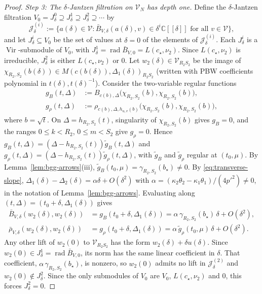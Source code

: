 \documentclass[twoside,10pt]{article}
\numberwithin{equation}{section}
\theoremstyle{slbody}
\theoremstyle{definition}
\theoremstyle{remark}
\newcommand{\Vir}{\operatorname{Vir}}
\newcommand{\rad}{\operatorname{rad}}
\begin{document}
\begin{proof}
\emph{Step 3: The \(\delta\)-Jantzen filtration on \(\mathcal{V}_N\) has depth one.}
Define the \(\delta\)-Jantzen filtration
\(V_0=J_\delta^0\supseteq J_\delta^1\supseteq J_\delta^2\supseteq\cdots\) by
\[
 \mathcal{J}_\delta^{(i)}
 :=\bigl\{a(\delta)\in\mathcal{V}:\bar B_{V,\delta}(a(\delta),v)\in\delta^i\mathbb{C}[[\delta]]
 \text{ for all }v\in\mathcal{V}\bigr\},
\]
and let \(J_\delta^i\subseteq V_0\) be the set of values at \(\delta=0\) of the
elements of \(\mathcal{J}_\delta^{(i)}\).  Each \(J_\delta^i\) is a \(\Vir\)-submodule of \(V_0\), with
\(J_\delta^1=\rad\bar B_{V,0}=L(c_\star,\nu_2)\).  Since \(L(c_\star,\nu_2)\) is
irreducible, \(J_\delta^2\) is either \(L(c_\star,\nu_2)\) or \(0\).
Let \(w_2(\delta)\in\mathcal{V}_{R_2S_2}\) be the image of
\(\chi_{R_2,S_2}(b(\delta))\in M(c(b(\delta)),\Delta_1(\delta))_{R_2S_2}\)
(written with PBW coefficients polynomial in \(t(\delta),t(\delta)^{-1}\)).
Consider the two-variable regular functions
\[
 \begin{aligned}
 g_B(t,\Delta)&:=B_{c(b),\Delta}\bigl(\chi_{R_2,S_2}(b),\chi_{R_2,S_2}(b)\bigr),\\
 g_\rho(t,\Delta)&:=\rho_{c(b),\Delta,h_{u,v}(b)}\bigl(\chi_{R_2,S_2}(b),\chi_{R_2,S_2}(b)\bigr),
 \end{aligned}
\]
where \(b=\sqrt{t}\).  On \(\Delta=h_{R_2,S_2}(t)\), singularity of
\(\chi_{R_2,S_2}(b)\) gives \(g_B=0\), and the ranges \(0\leq k<R_2\),
\(0\leq m<S_2\) give \(g_\rho=0\).  Hence
\(g_B(t,\Delta)=(\Delta-h_{R_2,S_2}(t))\tilde g_B(t,\Delta)\) and
\(g_\rho(t,\Delta)=(\Delta-h_{R_2,S_2}(t))\tilde g_\rho(t,\Delta)\), with
\(\tilde g_B\) and \(\tilde g_\rho\) regular at \((t_0,\mu)\).  By
Lemma~\ref{lem:bgg-arrows}(iii),
\(\tilde g_B(t_0,\mu)=\gamma_{R_2,S_2}(b_\star)\neq0\).  By
\eqref{eq:transverse-slope},
\(\Delta_1(\delta)-\Delta_2(\delta)=\alpha\delta+O(\delta^2)\) with
\(\alpha=(\kappa_2\theta_2-\kappa_1\theta_1)/(4p'^2)\neq0\), in the notation of
Lemma~\ref{lem:bgg-arrows}.  Evaluating along
\((t,\Delta)=(t_0+\delta,\Delta_1(\delta))\) gives
\begin{equation}\label{eq:tau-deriv-chain}
 \begin{aligned}
  \bar B_{V,\delta}(w_2(\delta),w_2(\delta))
  &=g_B(t_0+\delta,\Delta_1(\delta))
   =\alpha\,\gamma_{R_2,S_2}(b_\star)\,\delta+O(\delta^2),\\
  \bar\rho_{V,\delta}(w_2(\delta),w_2(\delta))
  &=g_\rho(t_0+\delta,\Delta_1(\delta))
   =\alpha\,\tilde g_\rho(t_0,\mu)\,\delta+O(\delta^2).
 \end{aligned}
\end{equation}
Any other lift of \(w_2(0)\) to \(\mathcal{V}_{R_2S_2}\) has the form
\(w_2(\delta)+\delta u(\delta)\).  Since \(w_2(0)\in J_\delta^1=\rad\bar B_{V,0}\), its
norm has the same linear coefficient in \(\delta\).  That coefficient,
\(\alpha\,\gamma_{R_2,S_2}(b_\star)\), is nonzero, so \(w_2(0)\) admits no lift
in \(\mathcal{J}_\delta^{(2)}\) and \(w_2(0)\notin J_\delta^2\).  Since the only
submodules of \(V_0\) are \(V_0\), \(L(c_\star,\nu_2)\) and \(0\), this forces
\(J_\delta^2=0\).


\end{proof}
\end{document}
